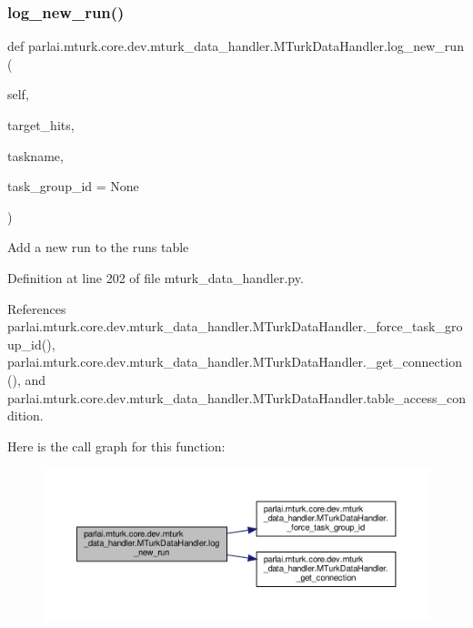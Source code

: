 \subsubsection{\texorpdfstring{log\+\_\+new\+\_\+run()}{log\_new\_run()}}
{\footnotesize\ttfamily def parlai.\+mturk.\+core.\+dev.\+mturk\+\_\+data\+\_\+handler.\+M\+Turk\+Data\+Handler.\+log\+\_\+new\+\_\+run (\begin{DoxyParamCaption}\item[{}]{self,  }\item[{}]{target\+\_\+hits,  }\item[{}]{taskname,  }\item[{}]{task\+\_\+group\+\_\+id = {\ttfamily None} }\end{DoxyParamCaption})}

\begin{DoxyVerb}Add a new run to the runs table\end{DoxyVerb}
 

Definition at line 202 of file mturk\+\_\+data\+\_\+handler.\+py.



References parlai.\+mturk.\+core.\+dev.\+mturk\+\_\+data\+\_\+handler.\+M\+Turk\+Data\+Handler.\+\_\+force\+\_\+task\+\_\+group\+\_\+id(), parlai.\+mturk.\+core.\+dev.\+mturk\+\_\+data\+\_\+handler.\+M\+Turk\+Data\+Handler.\+\_\+get\+\_\+connection(), and parlai.\+mturk.\+core.\+dev.\+mturk\+\_\+data\+\_\+handler.\+M\+Turk\+Data\+Handler.\+table\+\_\+access\+\_\+condition.

Here is the call graph for this function\+:
\nopagebreak
\begin{figure}[H]
\begin{center}
\leavevmode
\includegraphics[width=350pt]{classparlai_1_1mturk_1_1core_1_1dev_1_1mturk__data__handler_1_1MTurkDataHandler_ae8c02400cd4261b79571e6108955c883_cgraph}
\end{center}
\end{figure}
\mbox{\label{classparlai_1_1mturk_1_1core_1_1dev_1_1mturk__data__handler_1_1MTurkDataHandler_abf54a08cd2b503358c52229258c1f2c6}} 

